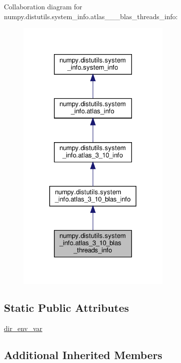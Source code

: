 Collaboration diagram for numpy.\+distutils.\+system\+\_\+info.\+atlas\+\_\+\_\+\_\+blas\+\_\+threads\+\_\+info\+:
\nopagebreak
\begin{figure}[H]
\begin{center}
\leavevmode
\includegraphics[width=212pt]{classnumpy_1_1distutils_1_1system__info_1_1atlas__3__10__blas__threads__info__coll__graph}
\end{center}
\end{figure}
\subsection*{Static Public Attributes}
\begin{DoxyCompactItemize}
\item 
\hyperlink{classnumpy_1_1distutils_1_1system__info_1_1atlas__3__10__blas__threads__info_abe5fee4509a3725d8a5c1b074369ad80}{dir\+\_\+env\+\_\+var}
\end{DoxyCompactItemize}
\subsection*{Additional Inherited Members}



